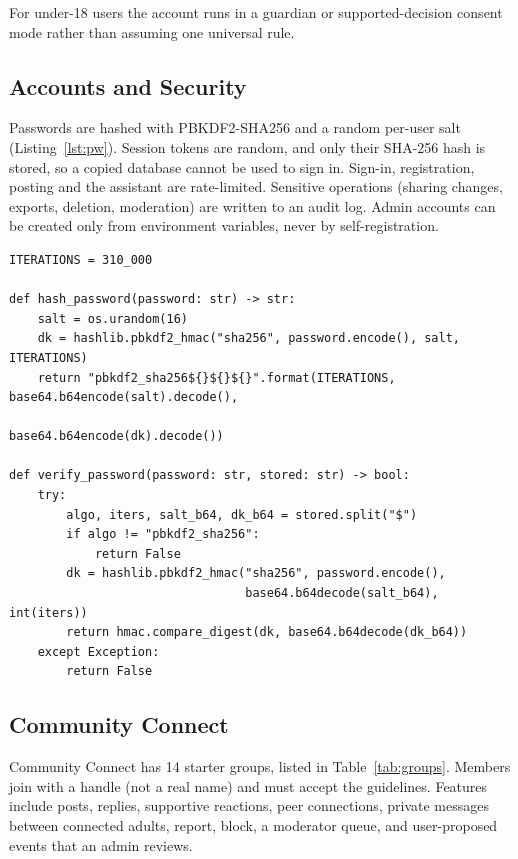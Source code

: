 \documentclass[11pt,a4paper]{article}
\newcommand{\code}[1]{\texttt{#1}}
\begin{document}
For under-18 users the account runs in a guardian or supported-decision consent mode rather than
assuming one universal rule.

\subsection{Accounts and Security}
Passwords are hashed with PBKDF2-SHA256 and a random per-user salt (Listing~\ref{lst:pw}). Session
tokens are random, and only their SHA-256 hash is stored, so a copied database cannot be used to sign
in. Sign-in, registration, posting and the assistant are rate-limited. Sensitive operations (sharing changes,
exports, deletion, moderation) are written to an audit log. Admin accounts can be created only from
environment variables, never by self-registration.

\par\noindent\begin{minipage}{\linewidth}\begin{lstlisting}[caption={Password hashing and constant-time verification (\code{nbapp/security.py}).},label={lst:pw}]
ITERATIONS = 310_000

def hash_password(password: str) -> str:
    salt = os.urandom(16)
    dk = hashlib.pbkdf2_hmac("sha256", password.encode(), salt, ITERATIONS)
    return "pbkdf2_sha256${}${}${}".format(ITERATIONS, base64.b64encode(salt).decode(),
                                          base64.b64encode(dk).decode())

def verify_password(password: str, stored: str) -> bool:
    try:
        algo, iters, salt_b64, dk_b64 = stored.split("$")
        if algo != "pbkdf2_sha256":
            return False
        dk = hashlib.pbkdf2_hmac("sha256", password.encode(),
                                 base64.b64decode(salt_b64), int(iters))
        return hmac.compare_digest(dk, base64.b64decode(dk_b64))
    except Exception:
        return False
\end{lstlisting}\end{minipage}\par

\subsection{Community Connect}
Community Connect has 14 starter groups, listed in Table~\ref{tab:groups}. Members join with a handle (not a real name) and
must accept the guidelines. Features include posts, replies, supportive reactions, peer connections,
private messages between connected adults, report, block, a moderator queue, and user-proposed
events that an admin reviews.
\end{document}
